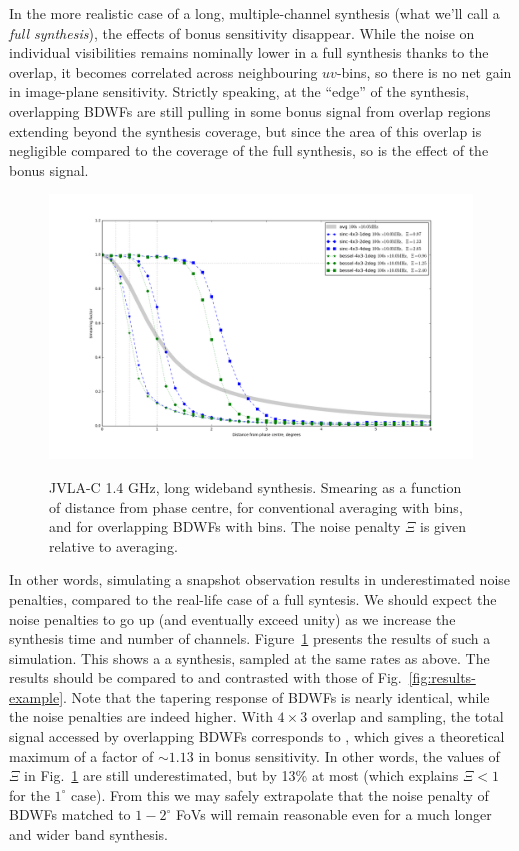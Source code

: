 \documentclass[useAMS,usenatbib]{mn2e}
\begin{document}
In the more realistic case of a long, multiple-channel synthesis (what we'll call a \emph{full synthesis}), the
effects of bonus sensitivity disappear. While the noise on individual visibilities remains nominally lower in a full 
synthesis thanks to the overlap, it becomes correlated across neighbouring $uv$-bins, so there is no net gain 
in image-plane sensitivity. Strictly speaking, at the ``edge'' of the synthesis, overlapping BDWFs are still pulling 
in some bonus signal from overlap regions extending beyond the synthesis coverage, but since the area of this 
overlap is negligible compared to the coverage of the full synthesis, so is the effect of the bonus signal.

\begin{figure}
\includegraphics[width=.9\textwidth]{./Figures/suppression-longsynth.png}\\
\caption{JVLA-C 1.4 GHz, long wideband synthesis. Smearing as a function of distance from phase centre, 
for conventional averaging with  bins, and for overlapping BDWFs with  bins.
The noise penalty $\Xi$ is given relative to  averaging.}
\label{fig:results-longsynth}
\end{figure}

In other words, simulating a snapshot observation results in underestimated noise penalties, compared to the
real-life case of a full syntesis. We should expect the noise penalties to go up (and eventually exceed unity) as 
we increase the synthesis time and number of channels. Figure~\ref{fig:results-longsynth} presents the results of such 
a simulation. This shows a a  synthesis, sampled at the same rates as above. The results should be 
compared to and contrasted with those of Fig.~\ref{fig:results-example}. Note that the tapering response of BDWFs is 
nearly identical, while the noise penalties are indeed higher. With $4\times3$ overlap and  sampling, 
the total signal accessed by overlapping BDWFs corresponds to , which gives a theoretical maximum of 
a factor of $\sim1.13$ in bonus sensitivity. In other words, the values of $\Xi$ in Fig.~\ref{fig:results-longsynth}
are still underestimated, but by 13\% at most (which explains $\Xi<1$ for the $1^\circ$ case). From this we may safely
extrapolate that the noise penalty of BDWFs matched to $1-2^\circ$ FoVs will remain reasonable even for a much longer 
and wider band synthesis.
\end{document}

